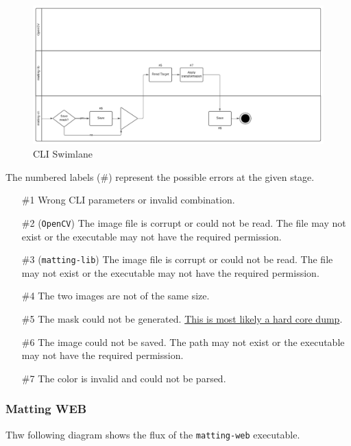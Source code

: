 \documentclass[a4paper]{article}
\begin{document}
\begin{figure}[h]
    \includegraphics[width=\textwidth]{media/swimlane/swimlane2.pdf}
    \caption{CLI Swimlane}
\end{figure}

The numbered labels (\#) represent the possible errors at the given stage.

\begin{itemize}
    \item[\#1] Wrong CLI parameters or invalid combination.
    \item[\#2] (\texttt{OpenCV}) The image file is corrupt or could not be read.
        The file may not exist or the executable may not have the required
        permission.
    \item[\#3] (\texttt{matting-lib}) The image file is corrupt or could not be read.
        The file may not exist or the executable may not have the required
        permission.
    \item[\#4] The two images are not of the same size.
    \item[\#5] The mask could not be generated. \underline{This is most likely a hard core dump}.
    \item[\#6] The image could not be saved. The path may not exist or the executable
        may not have the required permission.
    \item[\#7] The color is invalid and could not be parsed.
\end{itemize}

\pagebreak

\subsubsection{Matting WEB}

Thw following diagram shows the flux of the \texttt{matting-web} executable.
\end{document}
